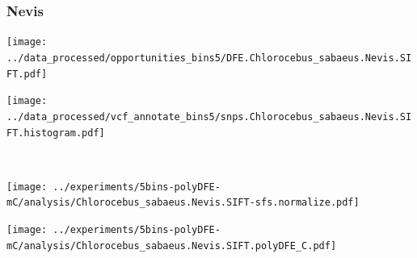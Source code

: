 \subsubsection{Nevis}

\begin{minipage}{0.49\linewidth}
    \texttt{[image: ../data\_processed/opportunities\_bins5/DFE.Chlorocebus\_sabaeus.Nevis.SIFT.pdf]}
\end{minipage}
\begin{minipage}{0.49\linewidth}
    \texttt{[image: ../data\_processed/vcf\_annotate\_bins5/snps.Chlorocebus\_sabaeus.Nevis.SIFT.histogram.pdf]}
\end{minipage}
\\
\begin{minipage}{0.49\linewidth}
    \texttt{[image: ../experiments/5bins-polyDFE-mC/analysis/Chlorocebus\_sabaeus.Nevis.SIFT-sfs.normalize.pdf]}
\end{minipage}
\begin{minipage}{0.4\linewidth}
    \texttt{[image: ../experiments/5bins-polyDFE-mC/analysis/Chlorocebus\_sabaeus.Nevis.SIFT.polyDFE\_C.pdf]}
\end{minipage}
